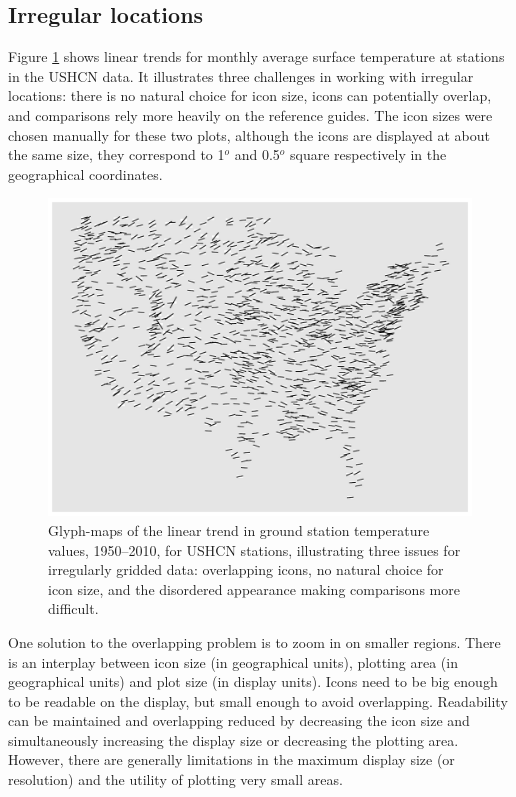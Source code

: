 \documentclass[oneside]{article}
\begin{document}
\subsection{Irregular locations}
Figure \ref{fig:irregular} shows linear trends for monthly average surface temperature at stations in the USHCN data.  It illustrates three challenges in working with irregular locations: there is no natural choice for icon size, icons can potentially overlap, and comparisons rely more heavily on the reference guides.  The icon sizes were chosen manually for these two plots, although the icons are displayed at about the same size, they correspond to 1$^o$ and 0.5$^o$ square respectively in the geographical coordinates. 
\begin{figure}[htbp]
  \centering
  \includegraphics[width=0.95\linewidth]{usa-lin-overlap}%
  \caption{Glyph-maps of the linear trend in ground station temperature values, 1950--2010, for USHCN stations, illustrating three issues for irregularly gridded data: overlapping icons, no natural choice for icon size, and the disordered appearance making comparisons more difficult. }%
  \label{fig:irregular}
\end{figure}
One solution to the overlapping problem is to zoom in on smaller regions. There is an interplay between icon size (in geographical units), plotting area (in geographical units) and plot size (in display units).  Icons need to be big enough to be readable on the display, but small enough to avoid overlapping.  Readability can be maintained and overlapping reduced by decreasing the icon size and simultaneously increasing the display size or decreasing the plotting area.
However, there are generally limitations in the maximum display size (or resolution) and the utility of plotting very small areas.  
\end{document}
